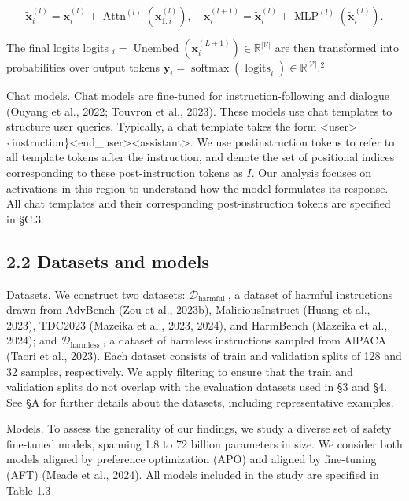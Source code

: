 \documentclass[10pt]{article}
\begin{document}
\begin{equation*}
\tilde{\mathbf{x}}_{i}^{(l)}=\mathbf{x}_{i}^{(l)}+\operatorname{Attn}^{(l)}\left(\mathbf{x}_{1: i}^{(l)}\right), \quad \mathbf{x}_{i}^{(l+1)}=\tilde{\mathbf{x}}_{i}^{(l)}+\operatorname{MLP}^{(l)}\left(\tilde{\mathbf{x}}_{i}^{(l)}\right) . \tag{1}
\end{equation*}


The final logits logits ${ }_{i}=\operatorname{Unembed}\left(\mathbf{x}_{i}^{(L+1)}\right) \in \mathbb{R}^{|\mathcal{V}|}$ are then transformed into probabilities over output tokens $\mathbf{y}_{i}=\operatorname{softmax}\left(\operatorname{logits}_{i}\right) \in \mathbb{R}^{|\mathcal{V}|} .^{2}$

Chat models. Chat models are fine-tuned for instruction-following and dialogue (Ouyang et al., 2022; Touvron et al., 2023). These models use chat templates to structure user queries. Typically, a chat template takes the form <user>\{instruction\}<end\_user><assistant>. We use postinstruction tokens to refer to all template tokens after the instruction, and denote the set of positional indices corresponding to these post-instruction tokens as $I$. Our analysis focuses on activations in this region to understand how the model formulates its response. All chat templates and their corresponding post-instruction tokens are specified in §C.3.

\subsection*{2.2 Datasets and models}
Datasets. We construct two datasets: $\mathcal{D}_{\text {harmful }}$, a dataset of harmful instructions drawn from AdvBench (Zou et al., 2023b), MaliciousInstruct (Huang et al., 2023), TDC2023 (Mazeika et al., 2023, 2024), and HarmBench (Mazeika et al., 2024); and $\mathcal{D}_{\text {harmless }}$, a dataset of harmless instructions sampled from AlPACA (Taori et al., 2023). Each dataset consists of train and validation splits of 128 and 32 samples, respectively. We apply filtering to ensure that the train and validation splits do not overlap with the evaluation datasets used in §3 and §4. See §A for further details about the datasets, including representative examples.

Models. To assess the generality of our findings, we study a diverse set of safety fine-tuned models, spanning 1.8 to 72 billion parameters in size. We consider both models aligned by preference optimization (APO) and aligned by fine-tuning (AFT) (Meade et al., 2024). All models included in the study are specified in Table 1.3
\end{document}
